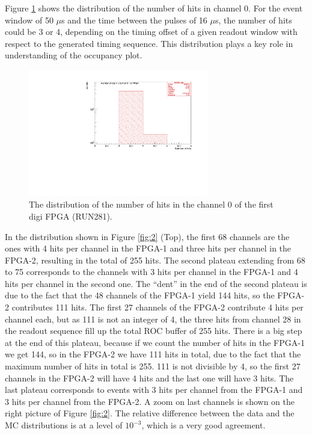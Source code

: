 Figure \ref{fig:66} shows the distribution of the number of hits in channel 0.
For the event window of 50 $\mu$s and the time between the pulses of 16 $\mu$s,
the number of hits could be 3 or 4,
depending on the timing offset of a given readout window with respect to the generated timing sequence.
This distribution plays a key role in understanding of the occupancy plot.
\begin{figure}[!h]
\centering
\includegraphics[width =0.7\textwidth]{figures/pdf/figure_00066_nhits_ch00_run281.pdf}
\caption{
  The distribution of the number of hits in the channel 0 of the first digi FPGA (RUN281).
}
\label{fig:66}
\end{figure}

In the distribution shown in Figure \ref{fig:2} (Top),
the first 68 channels are the ones with 4 hits per channel in the FPGA-1
and three hits per channel in the FPGA-2, 
resulting in the total of 255 hits.
The second plateau extending from 68 to 75 corresponds to the channels
with 3 hits per channel in the FPGA-1 and 4 hits per channel in the second one.
  The ``dent'' in the end of the second plateau is due to the fact that the 48 channels of the FPGA-1
  yield 144 hits, so the FPGA-2 contributes 111 hits. The first 27 channels of the FPGA-2 contribute
  4 hits per channel each, but as 111 is not an integer of 4, the three hits from channel 28 in the readout sequence
  fill up the total ROC buffer of 255 hits.
There is a big step at the end of this plateau, because if we count the number of hits
in the FPGA-1 we get 144, so in the FPGA-2 we have 111 hits in total,
due to the fact that the maximum number of hits in total is 255.
111 is not divisible by 4, so the first 27 channels in the FPGA-2 will have 4 hits
and the last one will have 3 hits.
The last plateau corresponds to events with 3 hits per channel from the FPGA-1
and 3 hits per channel from the FPGA-2.
A zoom on last channels is shown on the right picture of Figure \ref{fig:2}.
The relative difference between the data and the MC distributions is at a level of $10^{-3}$,
which is a very good agreement.

